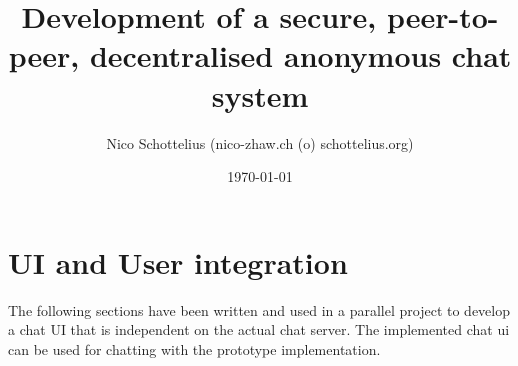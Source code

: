 \documentclass[12pt,a4paper]{report}
\begin{document}
\title{Development of a secure, peer-to-peer, decentralised anonymous chat system}
\date{\today}
\author{Nico Schottelius (nico-zhaw.ch (o) schottelius.org)}
\maketitle
\newpage
\tableofcontents
\listoftables
\listoffigures
\newpage


















\appendix
\chapter{UI and User integration}
The following sections have been written and used in a parallel project to
develop a chat UI that is independent on the actual chat server.
The implemented chat ui can be used for chatting with the prototype
implementation.



\end{document}
